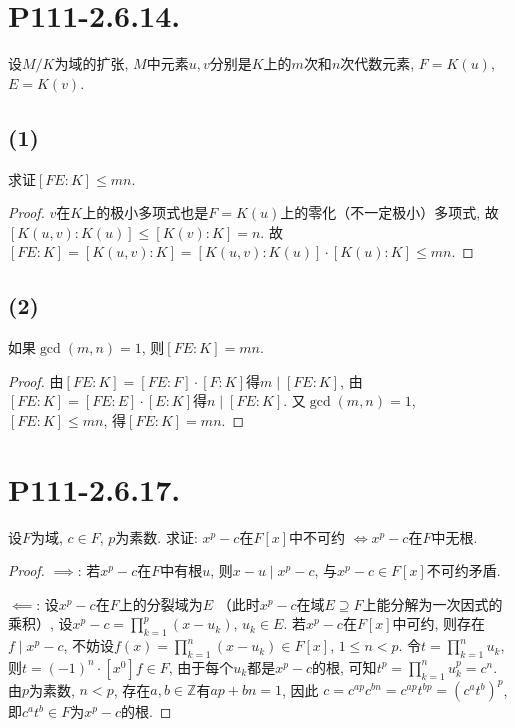\documentclass[12pt, a4paper, fontset=windows]{ctexart}
\newcommand{\Z}{\mathbb{Z}}
\newcommand{\kh}[1]{（{#1}）} %
\begin{document}
\section*{P111-2.6.14.}

设$M/K$为域的扩张, $M$中元素$u,v$分别是$K$上的$m$次和$n$次代数元素, 
$F=K(u)$, $E=K(v)$. 

\subsection*{(1)}

求证$[FE:K]\le mn$. 

\begin{proof}
$v$在$K$上的极小多项式也是$F=K(u)$上的零化\kh{不一定极小}多项式, 
故$[K(u,v):K(u)]\le[K(v):K]=n$. 故
$[FE:K]=[K(u,v):K]=[K(u,v):K(u)]\cdot[K(u):K]\le mn$. 
\end{proof}

\subsection*{(2)}

如果$\gcd(m,n)=1$, 则$[FE:K]=mn$. 

\begin{proof}
由$[FE:K]=[FE:F]\cdot[F:K]$得$m\mid[FE:K]$, 
由$[FE:K]=[FE:E]\cdot[E:K]$得$n\mid[FE:K]$. 
又$\gcd(m,n)=1$, $[FE:K]\le mn$, 得$[FE:K]=mn$. 
\end{proof}

\section*{P111-2.6.17.}

设$F$为域, $c\in F$, $p$为素数. 求证: $x^p-c$在$F[x]$中不可约
$\iff x^p-c$在$F$中无根. 

\begin{proof}
$\implies$: 若$x^p-c$在$F$中有根$u$, 则$x-u\mid x^p-c$, 
与$x^p-c\in F[x]$不可约矛盾. 

$\impliedby$: 设$x^p-c$在$F$上的分裂域为$E$
\kh{此时$x^p-c$在域$E\supseteq F$上能分解为一次因式的乘积}, 
设$x^p-c=\prod^p_{k=1}(x-u_k)$, $u_k\in E$. 
若$x^p-c$在$F[x]$中可约, 则存在$f\mid x^p-c$, 
不妨设$f(x)=\prod^n_{k=1}(x-u_k)\in F[x]$, $1\le n<p$. 
令$t=\prod^n_{k=1}u_k$, 则$t=(-1)^n\cdot[x^0]f\in F$, 
由于每个$u_k$都是$x^p-c$的根, 可知$t^p=\prod^n_{k=1}u_k^p=c^n$. 
由$p$为素数, $n<p$, 存在$a,b\in\Z$有$ap+bn=1$, 因此
$c=c^{ap}c^{bn}=c^{ap}t^{bp}=(c^at^b)^p$, 
即$c^at^b\in F$为$x^p-c$的根. 
\end{proof}
\end{document}
